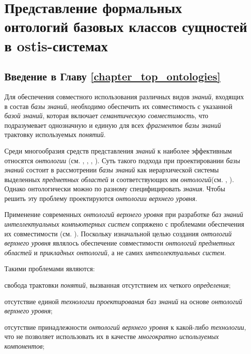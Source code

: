 \chapter{Представление формальных онтологий базовых классов сущностей в ostis-системах}
\label{chapter_top_ontologies}

\vspace{-7\baselineskip}

\section*{Введение в Главу \ref{chapter_top_ontologies}}

Для обеспечения совместного использования различных видов \textit{знаний}, входящих в состав \textit{базы знаний}, необходимо обеспечить их совместимость с указанной \textit{базой знаний}, которая включает \textit{семантическую совместимость}, что подразумевает однозначную и единую для всех \textit{фрагментов базы знаний} трактовку используемых \textit{понятий}.

Среди многообразия средств представления \textit{знаний} к наиболее эффективным относятся \textit{онтологии }(см. , , , ). Суть такого подхода при проектировании \textit{базы знаний} состоит в рассмотрении \textit{базы знаний} как иерархической системы выделенных \textit{предметных областей} и соответствующих им \textit{онтологий}(см. , ). Однако онтологически можно по разному специфицировать \textit{знания}. Чтобы решить эту проблему проектируются \textit{онтологии верхнего уровня}.

Применение современных \textit{онтологий верхнего уровня} при разработке \textit{баз знаний} \textit{интеллектуальных компьютерных систем} сопряжено с проблемами обеспечения их совместимости (см. ). Поскольку изначальной целью создания \textit{онтологий верхнего уровня} являлось обеспечение  совместимости \textit{онтологий} \textit{предметных областей} и \textit{прикладных онтологий}, а не самих \textit{интеллектуальных систем}. 

Такими проблемами являются:
\begin{textitemize}
    \item свобода трактовки \textit{понятий}, вызванная отсутствием их четкого \textit{определения};
    \item отсутствие единой \textit{технологии проектирования баз знаний} на основе \textit{онтологий верхнего уровня};
    \item отсутствие принадлежности \textit{онтологий верхнего уровня} к какой-либо \textit{технологии}, что не позволяет использовать их в качестве \textit{многократно используемых компонентов};
\end{textitemize}

